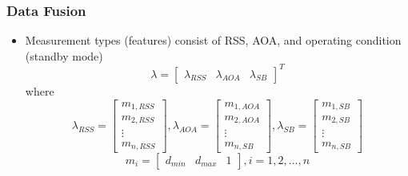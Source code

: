 \documentclass{beamer}
\begin{document}
\begin{frame}
\frametitle{Data Fusion}
\begin{itemize}
\item{Measurement types (features) consist of RSS, AOA, and operating condition (standby mode)
\begin{equation}
\lambda = \begin{bmatrix*}
\lambda_{RSS} &  \lambda_{AOA} &  \lambda_{SB} \end{bmatrix*}^T
\label{m}
\end{equation}
where
\begin{equation}
\lambda_{RSS} = \begin{bmatrix*}
m_{1,RSS} \\
m_{2,RSS} \\
\vdots \\
m_{n,RSS} \end{bmatrix*},
\lambda_{AOA} = \begin{bmatrix*}
m_{1,AOA} \\
m_{2,AOA} \\
\vdots \\
m_{n,SB} \end{bmatrix*},
\lambda_{SB} = \begin{bmatrix*}
m_{1,SB} \\
m_{2,SB} \\
\vdots \\
m_{n,SB} \end{bmatrix*}
\label{m}
\end{equation}
\begin{equation}
m_i = \begin{bmatrix*}
d_{min} & d_{max} & 1 \end{bmatrix*}, i = 1,2,\dots,n
\label{bpa-d}
\end{equation}}
\end{itemize}
\end{frame}
\end{document}
